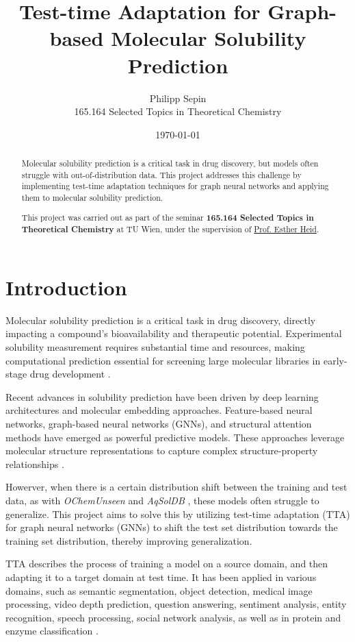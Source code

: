 \documentclass[11pt,a4paper]{article}
\title{Test-time Adaptation for Graph-based Molecular Solubility Prediction}
\author{Philipp Sepin\\
        165.164 Selected Topics in Theoretical Chemistry}
\date{\today}
\begin{document}
\maketitle

\begin{abstract}
        Molecular solubility prediction is a critical task in drug discovery, but models often struggle with out-of-distribution data. This project addresses this challenge by implementing test-time adaptation techniques for graph neural networks and applying them to molecular solubility prediction.

        This project was carried out as part of the seminar \textbf{165.164 Selected Topics in Theoretical Chemistry} at TU Wien, under the supervision of \href{https://hesther.github.io/}{Prof. Esther Heid}.
\end{abstract}

\section{Introduction}
Molecular solubility prediction is a critical task in drug discovery, directly impacting a compound's bioavailability and therapeutic potential. Experimental solubility measurement requires substantial time and resources, making computational prediction essential for screening large molecular libraries in early-stage drug development \cite{llompart2024will}.

Recent advances in solubility prediction have been driven by deep learning architectures and molecular embedding approaches. Feature-based neural networks, graph-based neural networks (GNNs), and structural attention methods have emerged as powerful predictive models. These approaches leverage molecular structure representations to capture complex structure-property relationships \cite{llompart2024will}.

Howerver, when there is a certain distribution shift between the training and test data, as with \textit{OChemUnseen} \cite{llompart2024will} and \textit{AqSolDB} \cite{sorkun2019aqsoldb}, these models often struggle to generalize. This project aims to solve this by utilizing test-time adaptation (TTA) for graph neural networks (GNNs) to shift the test set distribution towards the training set distribution, thereby improving generalization.

TTA describes the process of training a model on a source domain, and then adapting it to a target domain at test time. It has been applied in various domains, such as semantic segmentation, object detection, medical image processing, video depth prediction, question answering, sentiment analysis, entity recognition, speech processing, social network analysis, as well as in protein and enzyme classification \cite{liang2025comprehensive,cui2025online}.
\end{document}
